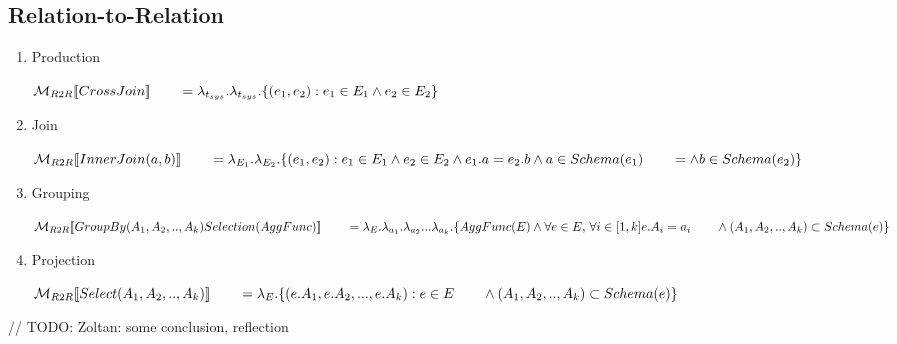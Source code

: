 \subsection*{Relation-to-Relation}
\begin{enumerate}
		
	\item Production
	
	$\mathcal{M}_{R2R}[\![CrossJoin]\!] \\
		{}\qquad= \lambda_{t_{sys}}.\lambda_{t_{sys}}.\{(e_1,e_2) : e_1 \in E_1 \land e_2 \in E_2 \}$
		
	\item Join
	
	$\mathcal{M}_{R2R}[\![InnerJoin(a,b)]\!] \\
		{}\qquad= \lambda_{E_1}.\lambda_{E_2}.\{(e_1,e_2) : e_1 \in E_1 \land e_2 \in E_2 \land e_1.a = e_2.b \land a \in Schema(e_1) \\
		{}\qquad= \land b \in Schema(e_2) \}$
		
	\item Grouping
	
		$\mathcal{M}_{R2R}[\![GroupBy(A_1,A_2,..,A_k) Selection(AggFunc)]\!] \\
		{}\qquad= \lambda_E.\lambda_{a_1}.\lambda_{a_2}...\lambda_{a_k}.\{AggFunc(E)  \land  \forall e \in E, \,\forall i \in [1,k] e.A_i= a_i \, \\
		{}\qquad\land (A_1,A_2,..,A_k) \subset Schema(e) \}$ 
	
	\item Projection
	
		$\mathcal{M}_{R2R}[\![Select(A_1,A_2,..,A_k)]\!] \\
		{}\qquad= \lambda_E.\{(e.A_1,e.A_2,...,e.A_k):e \in E \\
		{}\qquad\land (A_1,A_2,..,A_k) \subset Schema(e) \}$
	
\end{enumerate}


// TODO: Zoltan: some conclusion, reflection
